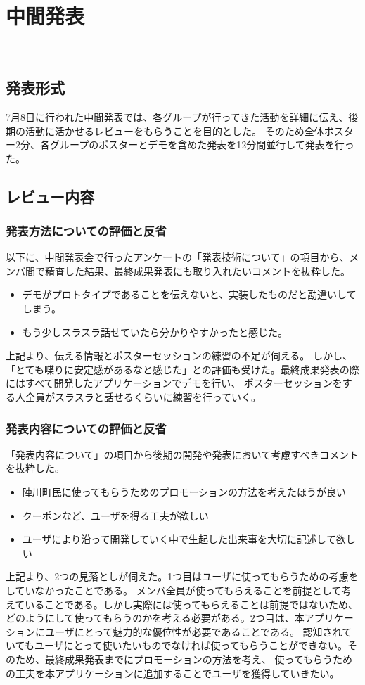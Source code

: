 \chapter{中間発表}
​
\section{発表形式}
7月8日に行われた中間発表では、各グループが行ってきた活動を詳細に伝え、後期の活動に活かせるレビューをもらうことを目的とした。
そのため全体ポスター2分、各グループのポスターとデモを含めた発表を12分間並行して発表を行った。

\section{レビュー内容}%
\subsection{発表方法についての評価と反省}%
以下に、中間発表会で行ったアンケートの「発表技術について」の項目から、メンバ間で精査した結果、最終成果発表にも取り入れたいコメントを抜粋した。
\begin{itemize}
  \item デモがプロトタイプであることを伝えないと、実装したものだと勘違いしてしまう。
  \item もう少しスラスラ話せていたら分かりやすかったと感じた。
\end{itemize}
    上記より、伝える情報とポスターセッションの練習の不足が伺える。
    しかし、「とても喋りに安定感があるなと感じた」との評価も受けた。最終成果発表の際にはすべて開発したアプリケーションでデモを行い、
    ポスターセッションをする人全員がスラスラと話せるくらいに練習を行っていく。

\subsection{発表内容についての評価と反省}
    「発表内容について」の項目から後期の開発や発表において考慮すべきコメントを抜粋した。
\begin{itemize}
  \item 陣川町民に使ってもらうためのプロモーションの方法を考えたほうが良い
  \item クーポンなど、ユーザを得る工夫が欲しい
  \item ユーザにより沿って開発していく中で生起した出来事を大切に記述して欲しい
\end{itemize}
    上記より、2つの見落としが伺えた。1つ目はユーザに使ってもらうための考慮をしていなかったことである。
    メンバ全員が使ってもらえることを前提として考えていることである。しかし実際には使ってもらえることは前提ではないため、
    どのようにして使ってもらうのかを考える必要がある。2つ目は、本アプリケーションにユーザにとって魅力的な優位性が必要であることである。
    認知されていてもユーザにとって使いたいものでなければ使ってもらうことができない。そのため、最終成果発表までにプロモーションの方法を考え、
    使ってもらうための工夫を本アプリケーションに追加することでユーザを獲得していきたい。

